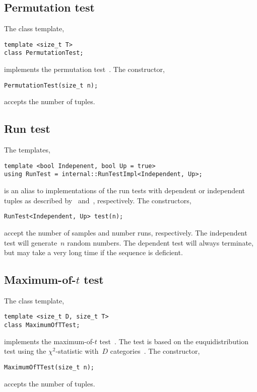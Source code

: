 \subsection{Permutation test}
\label{sub:Permutation test}

The class template,
\begin{verbatim}
template <size_t T>
class PermutationTest;
\end{verbatim}
implements the permutation test~\cite[pp.~65]{Knuth:1997us}. The constructor,
\begin{verbatim}
PermutationTest(size_t n);
\end{verbatim}
accepts the number of tuples.

\subsection{Run test}
\label{sub:Run test}

The templates,
\begin{verbatim}
template <bool Indepenent, bool Up = true>
using RunTest = internal::RunTestImpl<Independent, Up>;
\end{verbatim}
is an alias to implementations of the run tests with dependent or independent
tuples as described by~\cite[pp.~66]{Knuth:1997us} and~\cite[ex.~14,
pp.~77]{Knuth:1997us}, respectively. The constructors,
\begin{verbatim}
RunTest<Independent, Up> test(n);
\end{verbatim}
accept the number of samples and number runs, respectively. The independent
test will generate~$n$ random numbers. The dependent test will always
terminate, but may take a very long time if the sequence is deficient.

\subsection{Maximum-of-\texorpdfstring{$t$}{t} test}
\label{Maximum-of-t test}

The class template,
\begin{verbatim}
template <size_t D, size_t T>
class MaximumOfTTest;
\end{verbatim}
implements the maximum-of-$t$ test~\cite[pp.~70]{Knuth:1997us}. The test is
based on the euquidistribution test using the $\chi^2$-statistic with~$D$
categories~\cite[pp.~61]{Knuth:1997us}. The constructor,
\begin{verbatim}
MaximumOfTTest(size_t n);
\end{verbatim}
accepts the number of tuples.

